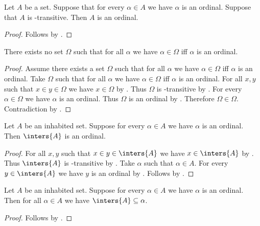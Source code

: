 \begin{proposition}\label{transitive_set_of_ordinals_is_ordinal}
    Let $A$ be a set.
    Suppose that for every $\alpha\in A$ we have $\alpha$ is an ordinal.
    Suppose that $A$ is \in-transitive.
    Then $A$ is an ordinal.
\end{proposition}
\begin{proof}
    Follows by .
\end{proof}

\begin{theorem}\label{buraliforti_antinomy}
    There exists no set $\Omega$ such that
    for all $\alpha$ we have $\alpha\in \Omega$ iff $\alpha$ is an ordinal.
\end{theorem}
\begin{proof}
    Assume there exists a set $\Omega$ such that
        for all $\alpha$ we have $\alpha\in \Omega$ iff $\alpha$ is an ordinal.
    Take $\Omega$ such that for all $\alpha$ we have
        $\alpha\in \Omega$ iff $\alpha$ is an ordinal.
    For all $x, y$ such that $x\in y\in \Omega$ we have $x\in \Omega$
        by .
    Thus $\Omega$ is \in-transitive by .
    For every $\alpha\in\Omega$ we have $\alpha$ is an ordinal.
    Thus $\Omega$ is an ordinal by .
    Therefore $\Omega\in\Omega$.
    Contradiction by .
\end{proof}

\begin{proposition}\label{inters_of_ordinals_is_ordinal}
    Let $A$ be an inhabited set.
    Suppose for every $\alpha\in A$ we have $\alpha$ is an ordinal.
    Then $\inters{A}$ is an ordinal.
\end{proposition}
\begin{proof}
    For all $x,y$ such that $x\in y\in\inters{A}$ we have $x\in\inters{A}$
        by .
    Thus $\inters{A}$ is \in-transitive by .
    Take $\alpha$ such that $\alpha\in A$.
    For every $y\in\inters{A}$ we have $y$ is an ordinal
        by .
    Follows by .
\end{proof}

\begin{proposition}\label{inters_of_ordinals_subseteq}
    Let $A$ be an inhabited set.
    Suppose for every $\alpha\in A$ we have $\alpha$ is an ordinal.
    Then for all $\alpha\in A$ we have $\inters{A}\subseteq \alpha$.
\end{proposition}
\begin{proof}
    Follows by .
\end{proof}


